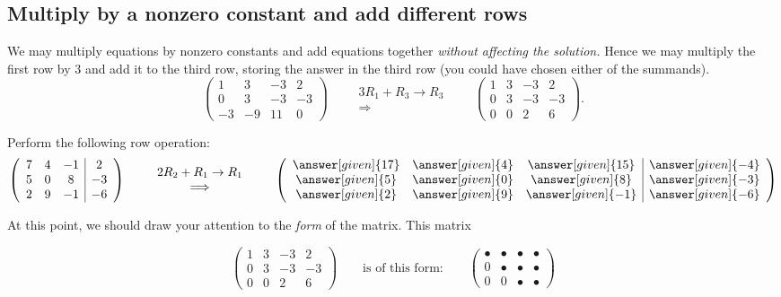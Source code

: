 \documentclass{ximera}
\begin{document}
\subsection{Multiply by a nonzero constant and add different rows}
We may multiply equations by nonzero constants and add equations together
\emph{without affecting the solution.} Hence we may multiply the first
row by $3$ and add it to the third row, storing the answer in the
third row (you could have chosen either of the summands).
\[
\left(\begin{array}{ccc|c}
  1 &   3 & -3 & 2  \\
  0 &   3 & -3 & -3 \\
  -3& -9  & 11 & 0
\end{array}\right)
\qquad
\begin{array}{c}
  \scriptstyle 3R_1+R_3\rightarrow R_3\\\Longrightarrow
\end{array}
\qquad
\left(\begin{array}{ccc|c}
  1 &   3 & -3 & 2  \\
  0 &   3 & -3 & -3 \\
  0& 0  & 2 & 6
\end{array}\right).
\]

\begin{question}
Perform the following row operation:
\[\left(\begin{array}{ccc|c}
7& 4& -1& 2\\
5 & 0 & 8 & -3\\
2 & 9 & -1 & -6
\end{array}\right)
\qquad
\begin{array}{c}
  2 R_{2} + R_{1} \rightarrow R_{1}\\\Longrightarrow
\end{array}
\qquad
\left(\begin{array}{ccc|c}
\answer[given]{17} & \answer[given]{4} & \answer[given]{15} & \answer[given]{-4}\\
\answer[given]{5} & \answer[given]{0} & \answer[given]{8} & \answer[given]{-3}\\
\answer[given]{2} & \answer[given]{9} & \answer[given]{-1} & \answer[given]{-6}
\end{array}\right)\]
\end{question}



At this point, we should draw your attention to the \emph{form} of the matrix. This matrix

\[
\begin{pmatrix}
  1 &   3 & -3 & 2  \\
  0 &   3 & -3 & -3 \\
  0& 0  & 2 & 6
\end{pmatrix}
\qquad
\text{is of this form:}
\qquad
\begin{pmatrix}
  \bullet & \bullet & \bullet & \bullet \\
     0   & \bullet & \bullet & \bullet \\
     0  &    0 & \bullet & \bullet
\end{pmatrix}
\]
\end{document}
